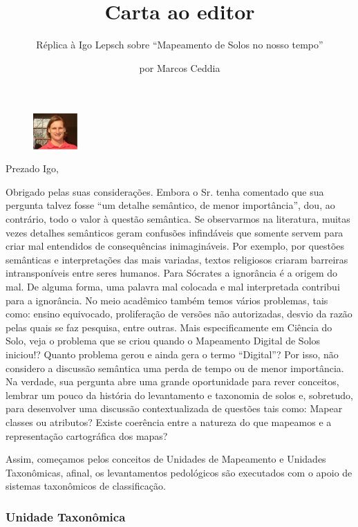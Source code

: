 \title{Carta ao editor}
\subtitle{Réplica à Igo Lepsch sobre ``Mapeamento de Solos no nosso tempo''}
\author{por Marcos Ceddia}
\maketitle

\begin{figure}
\includegraphics[width=0.15\textwidth]{figuras/marcos}
\end{figure}

Prezado Igo,

Obrigado pelas suas considerações. Embora o Sr. tenha comentado que sua pergunta talvez fosse ``um detalhe semântico, de menor importância'', dou, ao contrário, todo o valor à questão semântica. Se observarmos na literatura, muitas vezes detalhes semânticos geram confusões infindáveis que somente servem para criar mal entendidos de consequências inimagináveis. Por exemplo, por questões semânticas e interpretações das mais variadas, textos religiosos criaram barreiras intransponíveis entre seres humanos. Para Sócrates a ignorância é a origem do mal. De alguma forma, uma palavra mal colocada e mal interpretada contribui para a ignorância. No meio acadêmico também temos vários problemas, tais como: ensino equivocado, proliferação de versões não autorizadas, desvio da razão pelas quais se faz pesquisa, entre outras. Mais especificamente em Ciência do Solo, veja o problema que se criou quando o Mapeamento Digital de Solos iniciou!? Quanto problema gerou e ainda gera o termo ``Digital''? Por isso, não considero a discussão semântica uma perda de tempo ou de menor importância. Na verdade, sua pergunta abre uma grande oportunidade para rever conceitos, lembrar um pouco da história do levantamento e taxonomia de solos e, sobretudo, para desenvolver uma discussão contextualizada de questões tais como: Mapear classes ou atributos? Existe coerência entre a natureza do que mapeamos e a representação cartográfica dos mapas?

Assim, começamos pelos conceitos de Unidades de Mapeamento e Unidades Taxonômicas, afinal, os levantamentos pedológicos são executados com o apoio de sistemas taxonômicos de classificação.

\subsubsection{Unidade Taxonômica}

